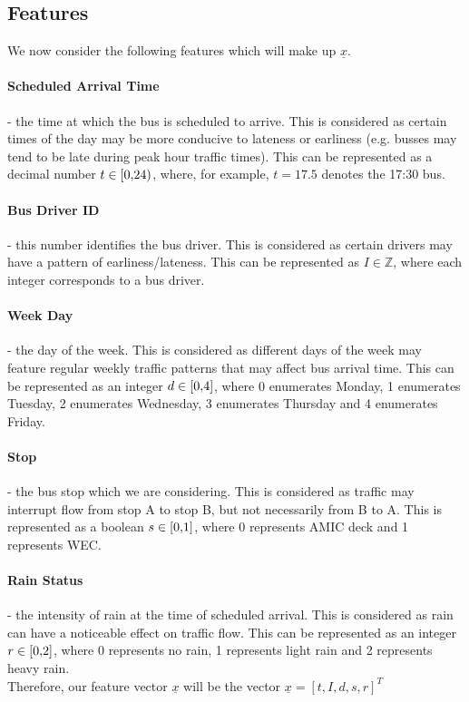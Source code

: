 \documentclass[11pt]{extarticle}
\begin{document}
\subsection{Features}
We now consider the following features which will make up $\underline{x}$.
\paragraph{Scheduled Arrival Time} - the time at which the bus is scheduled to arrive. This is considered as certain times of the day may be more conducive to lateness or earliness (e.g. busses may tend to be late during peak hour traffic times). This can be represented as a decimal number $t \in \interval[{0,24})$, where, for example, $t = 17.5$ denotes the 17:30 bus.
\paragraph{Bus Driver ID} - this number identifies the bus driver. This is considered as certain drivers may have a pattern of earliness/lateness. This can be represented as $I \in \mathbb{Z}$, where each integer corresponds to a bus driver.
\paragraph{Week Day} - the day of the week. This is considered as different days of the week may feature regular weekly traffic patterns that may affect bus arrival time. This can be represented as an integer $d \in \interval[{0,4}]$, where 0 enumerates Monday, 1 enumerates Tuesday, 2 enumerates Wednesday, 3 enumerates Thursday and 4 enumerates Friday.
\paragraph{Stop} - the bus stop which we are considering. This is considered as traffic may interrupt flow from stop A to stop B, but not necessarily from B to A. This is represented as a boolean $s \in \interval[{0,1}]$, where 0 represents AMIC deck and 1 represents WEC.
\paragraph{Rain Status} - the intensity of rain at the time of scheduled arrival. This is considered as rain can have a noticeable effect on traffic flow\cite{chung05}. This can be represented as an integer $r \in \interval[{0,2}]$, where 0 represents no rain, 1 represents light rain and 2 represents heavy rain.
\\[12pt]
Therefore, our feature vector $\underline{x}$ will be the vector $\underline{x} = [t,I,d,s,r]^{T}$
\end{document}
